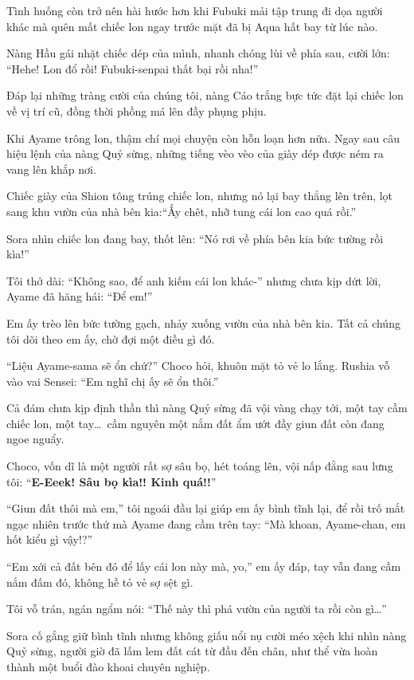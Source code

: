 \documentclass[../main.tex]{subfiles}
\begin{document}
Tình huống còn trở nên hài hước hơn khi Fubuki mải tập trung đi dọa người khác mà quên mất chiếc lon ngay trước mặt đã bị Aqua hất bay từ lúc nào.

Nàng Hầu gái nhặt chiếc dép của mình, nhanh chóng lùi về phía sau, cười lớn: ``Hehe! Lon đổ rồi! Fubuki-senpai thất bại rồi nha!''

Đáp lại những tràng cười của chúng tôi, nàng Cáo trắng bực tức đặt lại chiếc lon về vị trí cũ, đồng thời phồng má lên đầy phụng phịu.

\ct

Khi Ayame trông lon, thậm chí mọi chuyện còn hỗn loạn hơn nữa. Ngay sau câu hiệu lệnh của nàng Quỷ sừng, những tiếng vèo vèo của giày dép được ném ra vang lên khắp nơi.

Chiếc giày của Shion tông trúng chiếc lon, nhưng nó lại bay thẳng lên trên, lọt sang khu vườn của nhà bên kia:``Ấy chêt, nhỡ tung cái lon cao quá rồi.''

Sora nhìn chiếc lon đang bay, thốt lên: ``Nó rơi về phía bên kia bức tường rồi kìa!''

Tôi thở dài: ``Không sao, để anh kiếm cái lon khác-'' nhưng chưa kịp dứt lời, Ayame đã hăng hái: ``Để em!''

Em ấy trèo lên bức tường gạch, nhảy xuống vườn của nhà bên kia. Tất cả chúng tôi dõi theo em ấy, chờ đợi một điều gì đó.

``Liệu Ayame-sama sẽ ổn chứ?'' Choco hỏi, khuôn mặt tỏ vẻ lo lắng. Rushia vỗ vào vai Sensei: ``Em nghĩ chị ấy sẽ ổn thôi.''

Cả đám chưa kịp định thần thì nàng Quỷ sừng đã vội vàng chạy tới, một tay cầm chiếc lon, một tay\dots\ cầm nguyên một nắm đất ẩm ướt đầy giun đất còn đang ngoe nguẩy.

Choco, vốn dĩ là một người rất sợ sâu bọ, hét toáng lên, vội nấp đằng sau lưng tôi: ``\textbf{E-Eeek! Sâu bọ kìa!! Kinh quá!!}''

``Giun đất thôi mà em,'' tôi ngoái đầu lại giúp em ấy bình tĩnh lại, để rồi trố mắt ngạc nhiên trước thứ mà Ayame đang cầm trên tay: ``Mà khoan, Ayame-chan, em hốt kiểu gì vậy!?''

``Em xới cả đất bên đó để lấy cái lon này mà, yo,'' em ấy đáp, tay vẫn đang cầm nắm đấm đó, không hề tỏ vẻ sợ sệt gì.

Tôi vỗ trán, ngán ngẩm nói: ``Thế này thì phá vườn của người ta rồi còn gì\dots''

Sora cố gắng giữ bình tĩnh nhưng không giấu nổi nụ cười méo xệch khi nhìn nàng Quỷ sừng, người giờ đã lấm lem đất cát từ đầu đến chân, như thể vừa hoàn thành một buổi đào khoai chuyên nghiệp.
\end{document}
